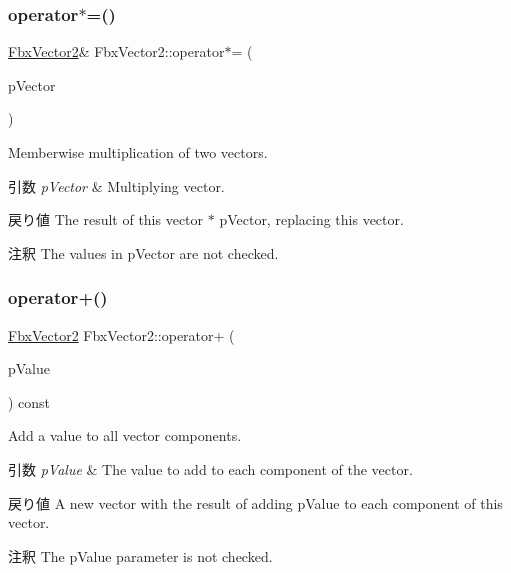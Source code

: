 \subsubsection{\texorpdfstring{operator$\ast$=()}{operator*=()}\hspace{0.1cm}{\footnotesize\ttfamily [2/2]}}
{\footnotesize\ttfamily \hyperlink{class_fbx_vector2}{Fbx\+Vector2}\& Fbx\+Vector2\+::operator$\ast$= (\begin{DoxyParamCaption}\item[{const \hyperlink{class_fbx_vector2}{Fbx\+Vector2} \&}]{p\+Vector }\end{DoxyParamCaption})}

Memberwise multiplication of two vectors. 
\begin{DoxyParams}{引数}
{\em p\+Vector} & Multiplying vector. \\
\hline
\end{DoxyParams}
\begin{DoxyReturn}{戻り値}
The result of this vector $\ast$ p\+Vector, replacing this vector. 
\end{DoxyReturn}
\begin{DoxyRemark}{注釈}
The values in p\+Vector are not checked. 
\end{DoxyRemark}
\mbox{\label{class_fbx_vector2_abe39db5f7fa88c58d5bb6562de8b0e08}} 
\subsubsection{\texorpdfstring{operator+()}{operator+()}\hspace{0.1cm}{\footnotesize\ttfamily [1/2]}}
{\footnotesize\ttfamily \hyperlink{class_fbx_vector2}{Fbx\+Vector2} Fbx\+Vector2\+::operator+ (\begin{DoxyParamCaption}\item[{double}]{p\+Value }\end{DoxyParamCaption}) const}

Add a value to all vector components. 
\begin{DoxyParams}{引数}
{\em p\+Value} & The value to add to each component of the vector. \\
\hline
\end{DoxyParams}
\begin{DoxyReturn}{戻り値}
A new vector with the result of adding p\+Value to each component of this vector. 
\end{DoxyReturn}
\begin{DoxyRemark}{注釈}
The p\+Value parameter is not checked. 
\end{DoxyRemark}
\mbox{\label{class_fbx_vector2_abe1301a610590c2eec654449b2420392}} 
